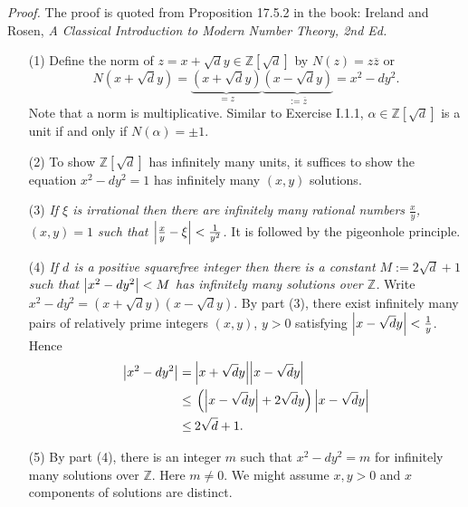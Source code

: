 \documentclass{article}
\begin{document}
\emph{Proof.}
The proof is quoted from Proposition 17.5.2 in the book:
Ireland and Rosen, \emph{A Classical Introduction to Modern Number Theory, 2nd Ed.}
\begin{enumerate}
\item[(1)]
  Define the norm of $z = x + \sqrt{d} y \in \mathbb{Z}[\sqrt{d}]$ by
  $N(z) = z \overline{z}$ or
  \[
    N(x + \sqrt{d} y)
    = \underbrace{(x + \sqrt{d} y)}_{= z} \underbrace{(x - \sqrt{d} y)}_{:= \overline{z}}
    = x^2 - dy^2.
  \]
  Note that a norm is multiplicative.
  Similar to Exercise I.1.1,
  $\alpha \in \mathbb{Z}[\sqrt{d}]$ is a unit if and only if $N(\alpha) = \pm 1$.

\item[(2)]
  To show $\mathbb{Z}[\sqrt{d}]$ has infinitely many units, it suffices to show
  the equation $x^2 - dy^2 = 1$ has infinitely many $(x,y)$ solutions.

\item[(3)]
  \emph{If $\xi$ is irrational then there are infinitely many rational numbers
  $\frac{x}{y}$, $(x,y) = 1$ such that $\abs{\frac{x}{y}-\xi} < \frac{1}{y^2}$.}
  It is followed by the pigeonhole principle.

\item[(4)]
  \emph{If $d$ is a positive squarefree integer then there is a constant $M := 2\sqrt{d}+1$
  such that $\abs{x^2 - dy^2} < M$ has infinitely many solutions over $\mathbb{Z}$.}
  Write $x^2 - dy^2 = (x + \sqrt{d} y)(x - \sqrt{d} y)$.
  By part (3), there exist infinitely many pairs of relatively prime integers $(x,y)$, $y > 0$
  satisfying $\abs{x - \sqrt{d} y} < \frac{1}{y}$.
  Hence
  \begin{align*}
    \abs{x^2 - dy^2}
    =& \: \abs{x + \sqrt{d} y}\abs{x - \sqrt{d} y} \\
    \leq & \: \left(\abs{x - \sqrt{d} y} + 2 \sqrt{d}y \right) \abs{x - \sqrt{d} y} \\
    \leq & \: 2 \sqrt{d} + 1.
  \end{align*}

\item[(5)]
  By part (4), there is an integer $m$ such that $x^2 - dy^2 = m$
  for infinitely many solutions over $\mathbb{Z}$.
  Here $m \neq 0$.
  We might assume $x, y > 0$ and $x$ components of solutions are distinct.


\end{enumerate}
\end{document}
